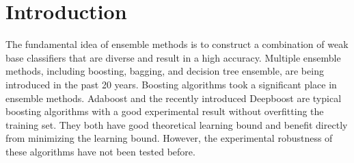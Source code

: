 \section{Introduction}
The fundamental idea of ensemble methods is to construct a combination of weak base classifiers that are diverse and result in a high accuracy.
Multiple ensemble methods, including boosting\cite{}, bagging\cite{}, and decision tree ensemble\cite{}, are being introduced in the past 20 years.
Boosting algorithms took a significant place in ensemble methods. Adaboost\cite{freund1997decision} and the recently introduced Deepboost\cite{cortes2014deep}
are typical boosting algorithms with a good experimental result without overfitting the training set. They both have good theoretical learning bound
and benefit directly from minimizing the learning bound. However, the experimental robustness of these algorithms have not been tested before.
